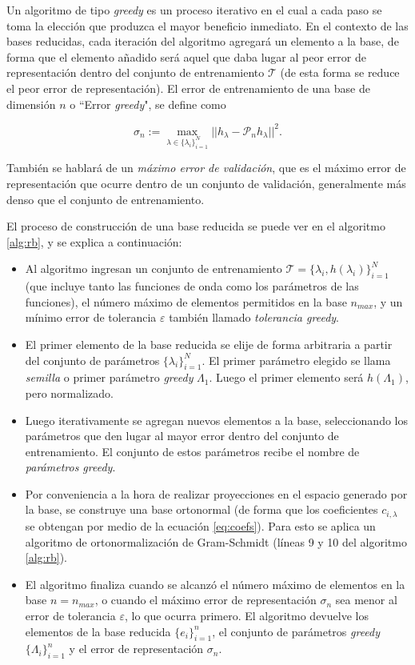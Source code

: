 Un algoritmo de tipo \textit{greedy} es un proceso iterativo en el cual a cada paso se toma la elección que produzca el mayor beneficio inmediato.
En el contexto de las bases reducidas, cada iteración del algoritmo agregará un elemento a la base, de forma que el elemento añadido será aquel que daba lugar al peor error de representación dentro del conjunto de entrenamiento $\mathcal{T}$ (de esta forma se reduce el peor error de representación). El error de entrenamiento de una base de dimensión $n$ o ``Error \textit{greedy}", se define como 

\[
\sigma_n := \max_{\lambda \in  \{ \lambda_{i}\}_{i=1}^N } || h_{\lambda} - \mathcal{P}_nh_{\lambda} ||^2.
\]

También se hablará de un \textit{máximo error de validación}, que es el máximo error de representación que ocurre dentro de un conjunto de validación, generalmente más denso que el conjunto de entrenamiento.

El proceso de construcción de una base reducida se puede ver en el algoritmo \ref{alg:rb}, y se explica a continuación:

\begin{itemize}
\item Al algoritmo ingresan un conjunto de entrenamiento $\mathcal{T} = \{ \lambda_{i}, h(\lambda_i) \}_{i=1}^N$ (que incluye tanto las funciones de onda como los parámetros de las funciones), el número máximo de elementos permitidos en la base $n_{max}$, y un mínimo error de tolerancia $\varepsilon$ también llamado \textit{tolerancia greedy}.
\item El primer elemento de la base reducida se elije de forma arbitraria a partir del conjunto de parámetros $\{\lambda_{i}\}_{i=1}^N$. El primer parámetro elegido se llama \textit{semilla} o primer parámetro \textit{greedy} $\Lambda_1$. Luego el primer elemento será $h(\Lambda_1)$, pero normalizado.
\item Luego iterativamente se agregan nuevos elementos a la base, seleccionando los parámetros que den lugar al mayor error dentro del conjunto de entrenamiento. El conjunto de estos parámetros recibe el nombre de \textit{parámetros greedy}.
\item Por conveniencia a la hora de realizar proyecciones en el espacio generado por la base, se construye una base ortonormal (de forma que los coeficientes $c_{i,\lambda}$ se obtengan por medio de la ecuación \eqref{eq:coefs}). Para esto se aplica un algoritmo de ortonormalización de Gram-Schmidt (líneas 9 y 10 del algoritmo \ref{alg:rb}).
\item El algoritmo finaliza cuando se alcanzó el número máximo de elementos en la base $n = n_{max}$, o cuando el máximo error de representación $\sigma_n$ sea menor al error de tolerancia $\varepsilon$, lo que ocurra primero. El algoritmo devuelve los elementos de la base reducida $\{ e_i\}_{i=1}^{n}$, el conjunto de parámetros \textit{greedy} $\{\Lambda_i\}_{i=1}^{n}$ y el error de representación $\sigma_n$.
\end{itemize}

